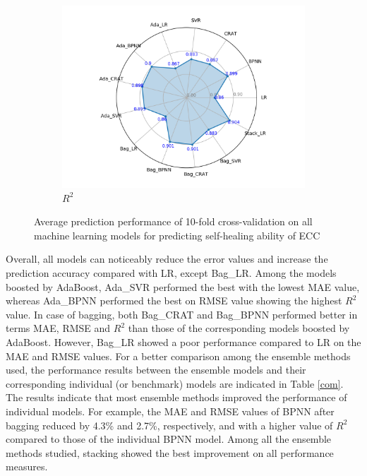 \documentclass[11pt]{article}
\begin{document}
\begin{figure}[!h]
\begin{subfigure}{.53\textwidth}
			\includegraphics[width = \linewidth]{R2circle.png}
			\caption{$R^2$}
		\end{subfigure}%
		\hspace{1em}
		\caption{Average prediction performance of 10-fold cross-validation on all machine learning models for predicting self-healing ability of ECC }\label{comp}
	\end{figure}
	

	Overall, all models can noticeably reduce the error values and increase the prediction accuracy compared with LR, except Bag\_LR. Among the models boosted by AdaBoost, Ada\_SVR performed the best with the lowest MAE value, whereas Ada\_BPNN performed the best on RMSE value showing the highest $R^2$ value. In case of bagging, both Bag\_CRAT and Bag\_BPNN performed better in terms MAE, RMSE and $R^2$ than those of the corresponding models boosted by AdaBoost. However, Bag\_LR showed a poor performance compared to LR on the MAE and RMSE values. For a better comparison among the ensemble methods used, the performance results between the ensemble models and their corresponding individual (or benchmark) models are indicated in Table \ref{com}. The results indicate that most ensemble methods improved the performance of individual models. For example, the MAE and RMSE values of BPNN after bagging reduced by 4.3\% and 2.7\%, respectively, and with a higher value of $R^2$ compared to those of the individual BPNN model. Among all the ensemble methods studied, stacking showed the best improvement on all performance measures.
	

	
\end{document}
